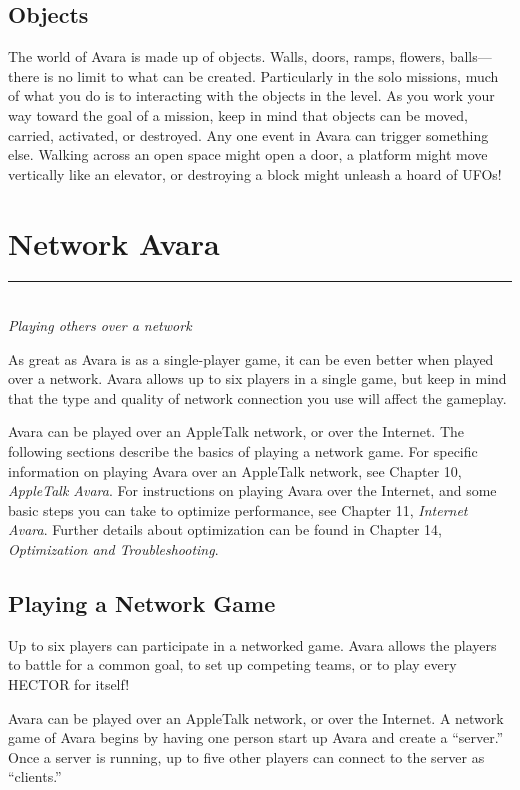 \documentclass{article}
\let\oldsection\section
\renewcommand\section{\clearpage\oldsection}
\begin{document}
\subsection{Objects}
The world of Avara is made up of objects. Walls, doors, ramps, flowers, balls---there is no limit to what can be created. Particularly in the solo missions, much of what you do is to interacting with the objects in the level. As you work your way toward the goal of a mission, keep in mind that objects can be moved, carried, activated, or destroyed. Any one event in Avara can trigger something else. Walking across an open space might open a door, a platform might move vertically like an elevator, or destroying a block might unleash a hoard of UFOs!


\section{Network Avara}
\rule{5.5cm}{.15pt}\\
\rmfamily\textit{Playing others over a network}

As great as Avara is as a single-player game, it can be even better when played over a network. Avara allows up to six players in a single game, but keep in mind that the type and quality of network connection you use will affect the gameplay.

Avara can be played over an AppleTalk network, or over the Internet. The following sections describe the basics of playing a network game. For specific information on playing Avara over an AppleTalk network, see Chapter 10, \textit{AppleTalk Avara}. For instructions on playing Avara over the Internet, and some basic steps you can take to optimize performance, see Chapter 11, \textit{Internet Avara}. Further details about optimization can be found in Chapter 14, \textit{Optimization and Troubleshooting}.

\subsection{Playing a Network Game}
Up to six players can participate in a networked game. Avara allows the players to battle for a common goal, to set up competing teams, or to play every HECTOR for itself!

Avara can be played over an AppleTalk network, or over the Internet. A network game of Avara begins by having one person start up Avara and create a ``server.'' Once a server is running, up to five other players can connect to the server as ``clients.''
\end{document}
